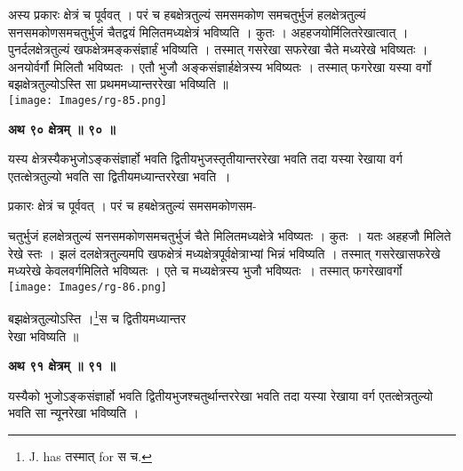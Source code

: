 \documentclass[11pt, openany]{book}
\begin{document}
\begin{vwcol}[widths={0.6,0.4}, sep=.8cm, rule=0pt]
 अस्य प्रकारः क्षेत्रं च पूर्ववत् । परं च हबक्षेत्रतुल्यं
समसमकोण समचतुर्भुजं हलक्षेत्रतुल्यं सनसमकोणसमचतुर्भुजं चैतद्वयं मिलितमध्यक्षेत्रं भविष्यति । कुतः । अहहजयोर्मिलितरेखात्वात् । पुनर्दलक्षेत्रतुल्यं खफक्षेत्रमङ्कसंज्ञार्हं भविष्यति । तस्मात् गसरेखा सफरेखा चैते मध्यरेखे भविष्यतः । अनयोर्वर्गौ मिलितौ भविष्यतः । एतौ भुजौ अङ्कसंज्ञार्हक्षेत्रस्य भविष्यतः । तस्मात् फगरेखा यस्या वर्गो बझक्षेत्रतुल्योऽस्ति सा प्रथममध्यान्तररेखा भविष्यति ॥ \\
\noindent \texttt{[image: Images/rg-85.png]}\\
\end{vwcol}

\begin{center}
\textbf{\large अथ ९० क्षेत्रम् ॥ ९० ॥}
\end{center}
\vspace{5mm}

{\ab यस्य क्षेत्रस्यैकभुजोऽङ्कसंज्ञार्हो भवति द्वितीयभुजस्तृतीयान्तररेखा भवति तदा यस्या रेखाया वर्ग एतत्क्षेत्रतुल्यो भवति सा द्वितीयमध्यान्तररेखा भवति~।}\\
\vspace{3mm}


 प्रकारः क्षेत्रं च पूर्ववत् । परं च हबक्षेत्रतुल्यं
समसमकोणसम-

\newpage
\begin{vwcol}[widths={0.65,0.35}, sep=.8cm, rule=0pt]
\noindent चतुर्भुजं हलक्षेत्रतुल्यं सनसमकोणसमचतुर्भुजं चैते मिलितमध्यक्षेत्रे भविष्यतः । कुतः~। यतः अहहजौ मिलिते रेखे स्तः । झलं दलक्षेत्रतुल्यमपि खफक्षेत्रं मध्यक्षेत्रपूर्वक्षेत्राभ्यां भिन्नं भविष्यति । तस्मात् गसरेखासफरेखे मध्यरेखे केवलवर्गमिलिते भविष्यतः । एते च मध्यक्षेत्रस्य भुजौ भविष्यतः~। तस्मात् फगरेखावर्गो  \\
\noindent \texttt{[image: Images/rg-86.png]}\\
\end{vwcol}
\vspace{-9mm}

\noindent बझक्षेत्रतुल्योऽस्ति ।\renewcommand{\thefootnote}{१}\footnote{{\en J. has} तस्मात् {\en for} स च.}स च द्वितीयमध्यान्तर\\रेखा भविष्यति ॥ \\


\begin{center}
\textbf{\large अथ ९१ क्षेत्रम् ॥ ९१ ॥}
\end{center}
\medskip

{\ab यस्यैको भुजोऽङ्कसंज्ञार्हो भवति द्वितीयभुजश्चतुर्थान्तररेखा भवति
तदा यस्या रेखाया वर्ग एतत्क्षेत्रतुल्यो
भवति सा न्यूनरेखा भविष्यति । }\\
\vspace{5mm}
\end{document}

